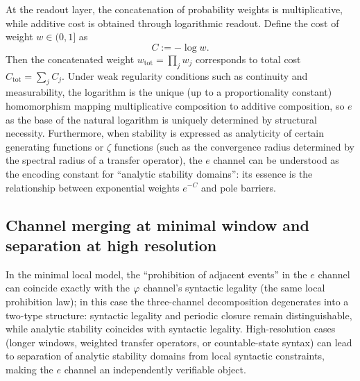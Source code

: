 At the readout layer, the concatenation of probability weights is multiplicative, while additive cost is obtained through logarithmic readout. Define the cost of weight $w\in(0,1]$ as
\[
C:=-\log w.
\]
Then the concatenated weight $w_{\mathrm{tot}}=\prod_j w_j$ corresponds to total cost $C_{\mathrm{tot}}=\sum_j C_j$. Under weak regularity conditions such as continuity and measurability, the logarithm is the unique (up to a proportionality constant) homomorphism mapping multiplicative composition to additive composition, so $e$ as the base of the natural logarithm is uniquely determined by structural necessity.
Furthermore, when stability is expressed as analyticity of certain generating functions or $\zeta$ functions (such as the convergence radius determined by the spectral radius of a transfer operator), the $e$ channel can be understood as the encoding constant for ``analytic stability domains'': its essence is the relationship between exponential weights $e^{-C}$ and pole barriers.

\subsection{Channel merging at minimal window and separation at high resolution}

In the minimal local model, the ``prohibition of adjacent events'' in the $e$ channel can coincide exactly with the $\varphi$ channel's syntactic legality (the same local prohibition law); in this case the three-channel decomposition degenerates into a two-type structure: syntactic legality and periodic closure remain distinguishable, while analytic stability coincides with syntactic legality. High-resolution cases (longer windows, weighted transfer operators, or countable-state syntax) can lead to separation of analytic stability domains from local syntactic constraints, making the $e$ channel an independently verifiable object.
